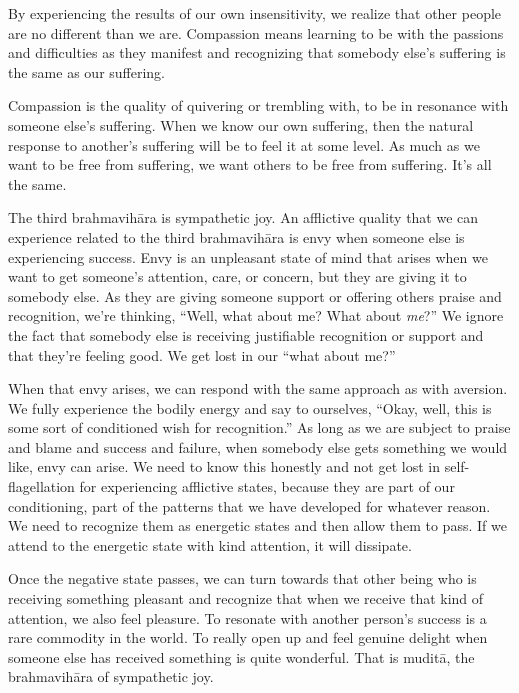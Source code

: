 \enlargethispage{1\baselineskip}
By experiencing the results of our own insensitivity, we realize that other people are no different than we are. Compassion means learning to be with the passions and difficulties as they manifest and recognizing that somebody else's suffering is the same as our suffering.

Compassion is the quality of quivering or trembling with, to be in resonance with someone else's suffering. When we know our own suffering, then the natural response to another's suffering will be to feel it at some level. As much as we want to be free from suffering, we want others to be free from suffering. It's all the same.

The third brahmavihāra is sympathetic joy. An afflictive quality that we can experience related to the third brahmavihāra is envy when someone else is experiencing success. Envy is an unpleasant state of mind that arises when we want to get someone's attention, care, or concern, but they are giving it to somebody else. As they are giving someone support or offering others praise and recognition, we're thinking, ``Well, what about me? What about \emph{me}?'' We ignore the fact that somebody else is receiving justifiable recognition or support and that they're feeling good. We get lost in our ``what about me?''

When that envy arises, we can respond with the same approach as with aversion. We fully experience the bodily energy and say to ourselves, ``Okay, well, this is some sort of conditioned wish for recognition.'' As long as we are subject to praise and blame and success and failure, when somebody else gets something we would like, envy can arise. We need to know this honestly and not get lost in self-flagellation for experiencing afflictive states, because they are part of our conditioning, part of the patterns that we have developed for whatever reason. We need to recognize them as energetic states and then allow them to pass. If we attend to the energetic state with kind attention, it will dissipate.

Once the negative state passes, we can turn towards that other being who is receiving something pleasant and recognize that when we receive that kind of attention, we also feel pleasure. To resonate with another person's success is a rare commodity in the world. To really open up and feel genuine delight when someone else has received something is quite wonderful. That is muditā, the brahmavihāra of sympathetic joy.


